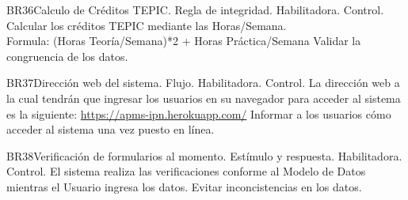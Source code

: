  \begin{BussinesRule}{BR36}{Calculo de Créditos TEPIC.}
     \BRitem[Tipo:] Regla de integridad.
     \BRitem[Clase:] Habilitadora.
     \BRitem[Nivel:] Control.
     \BRitem[Descripción:]Calcular los créditos TEPIC mediante las Horas/Semana.\\
     Formula: (Horas Teoría/Semana)*2 + Horas Práctica/Semana
     \BRitem[Motivación:] Validar la congruencia de los datos.
  \end{BussinesRule}
   \begin{BussinesRule}{BR37}{Dirección web del sistema.}
     \BRitem[Tipo:] Flujo.
     \BRitem[Clase:] Habilitadora.
     \BRitem[Nivel:] Control.
     \BRitem[Descripción:] La dirección web a la cual tendrán que ingresar los usuarios en su navegador para acceder al sistema es la siguiente: \url{https://apms-ipn.herokuapp.com/}
     \BRitem[Motivación:] Informar a los usuarios cómo acceder al sistema una vez puesto en línea.
  \end{BussinesRule}
    \begin{BussinesRule}{BR38}{Verificación de formularios al momento.}
      \BRitem[Tipo:]  Estímulo y respuesta.
      \BRitem[Clase:] Habilitadora.
      \BRitem[Nivel:] Control.
      \BRitem[Descripción:] El sistema realiza las verificaciones conforme al Modelo de Datos mientras el Usuario ingresa los datos.
      \BRitem[Motivación:] Evitar inconcistencias en los datos.
   \end{BussinesRule}
